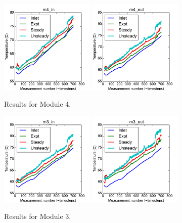 \documentclass{article}
\begin{document}
\clearpage
\begin{figure}[!ht]
\centering
\includegraphics[width=0.4\textwidth]{../../data/ICSolar/images/Feb11_m4_in_compare.pdf}\hspace{0.05\textwidth}
\includegraphics[width=0.4\textwidth]{../../data/ICSolar/images/Feb11_m4_out_compare.pdf}\hspace{0.05\textwidth}\\
\caption{Results for Module 4.}\end{figure}
\begin{figure}[!ht]
\centering
\includegraphics[width=0.4\textwidth]{../../data/ICSolar/images/Feb11_m3_in_compare.pdf}\hspace{0.05\textwidth}
\includegraphics[width=0.4\textwidth]{../../data/ICSolar/images/Feb11_m3_out_compare.pdf}\hspace{0.05\textwidth}\\
\caption{Results for Module 3.}\end{figure}
\end{document}
